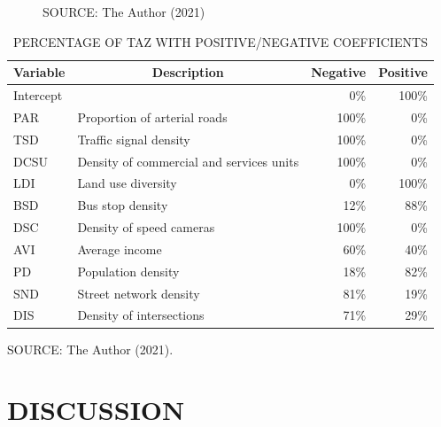\begin{figure}[!htbp]
\begin{subfigure}{0.5\textwidth}
    \end{subfigure}    
    \label{fig:gwr_dis}
    \par SOURCE: The Author (2021)
\end{figure}


\begin{table}[!htbp]
    \footnotesize
    \captionsetup{justification=raggedright,
        singlelinecheck=false,
        font=footnotesize}
    \caption{PERCENTAGE OF TAZ WITH POSITIVE/NEGATIVE COEFFICIENTS}
    \centering
    \begin{tabular}{llrr}
        \hline
        \multicolumn{1}{c}{\textbf{Variable}} & \multicolumn{1}{c}{\textbf{Description}} & \multicolumn{1}{c}{\textbf{Negative}} & \multicolumn{1}{c}{\textbf{Positive}} \\
        \hline
        \multicolumn{2}{l}{Intercept}                   &   0\% & 100\% \\
        PAR  & Proportion of arterial roads             & 100\% &   0\% \\
        TSD  & Traffic signal density                   & 100\% &   0\% \\
        DCSU & Density of commercial and services units & 100\% &   0\% \\
        LDI  & Land use diversity                       &   0\% & 100\% \\
        BSD  & Bus stop density                         &  12\% &  88\% \\
        DSC  & Density of speed cameras                 & 100\% &   0\% \\
        AVI  & Average income                           &  60\% &  40\% \\
        PD   & Population density                       &  18\% &  82\% \\
        SND  & Street network density                   &  81\% &  19\% \\
        DIS  & Density of intersections                 &  71\% &  29\% \\
        \hline
    \end{tabular}
    \label{tab:coef_perc}
    \par \vspace{2mm} \footnotesize \raggedright
    SOURCE: The Author (2021).
\end{table}

\section{DISCUSSION} \label{sec:discussion}

